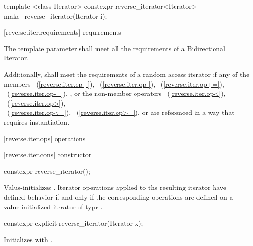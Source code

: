 \begin{codeblock}
{  template <class Iterator>
    constexpr reverse_iterator<Iterator> make_reverse_iterator(Iterator i);
}
\end{codeblock}

[reverse.iter.requirements]{ requirements}

\pnum
The template parameter
shall meet all the requirements of a Bidirectional Iterator.

\pnum
Additionally,
shall meet the requirements of a random access iterator
if any of the members
~(\ref{reverse.iter.op+}),
~(\ref{reverse.iter.op-}),
~(\ref{reverse.iter.op+=}),
~(\ref{reverse.iter.op-=}),
,
or the non-member operators
~(\ref{reverse.iter.op<}),
~(\ref{reverse.iter.op>}),\\
~(\ref{reverse.iter.op<=}),
~(\ref{reverse.iter.op>=}),
or
are referenced in a way that requires instantiation.

[reverse.iter.ops]{ operations}

[reverse.iter.cons]{ constructor}

%
\begin{itemdecl}
constexpr reverse_iterator();
\end{itemdecl}

\begin{itemdescr}
\pnum
\effects
Value-initializes
.
Iterator operations applied to the resulting iterator have defined behavior
if and only if the corresponding operations are defined on a value-initialized iterator of type
.
\end{itemdescr}

%
\begin{itemdecl}
constexpr explicit reverse_iterator(Iterator x);
\end{itemdecl}

\begin{itemdescr}
\pnum
\effects
Initializes
with .
\end{itemdescr}

